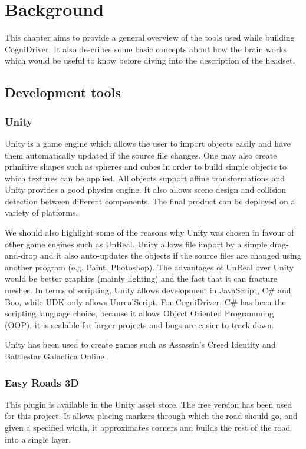 \chapter{Background}
\label{cha:background}

This chapter aims to provide a general overview of the tools used while building CogniDriver. It also describes some basic concepts about how the brain works which would be useful to know before diving into the description of the headset. 

\section{Development tools}

\subsection{Unity}
Unity is a game engine which allows the user to import objects easily and have them automatically updated if the source file changes. One may also create primitive shapes such as spheres and cubes in order to build simple objects to which textures can be applied. All objects support affine transformations and Unity provides a good physics engine. It also allows scene design and collision detection between different components. The final product can be deployed on a variety of platforms.

We should also highlight some of the reasons why Unity was chosen in favour of other game engines such as UnReal. Unity allows file import by a simple drag-and-drop and it also auto-updates the objects if the source files are changed using another program (e.g. Paint, Photoshop). The advantages of UnReal over Unity would be better graphics (mainly lighting) and the fact that it can fracture meshes. In terms of scripting, Unity allows development in JavaScript, C\# and Boo, while UDK only allows UnrealScript. For CogniDriver, C\# has been the scripting language choice, because it allows Object Oriented Programming (OOP), it is scalable for larger projects and bugs are easier to track down. 

Unity has been used to create games such as Assassin's Creed Identity \cite{assassins} and Battlestar Galactica Online \cite{battlestar}.

\subsection{Easy Roads 3D}
This plugin is available in the Unity asset store. The free version has been used for this project. It allows placing markers through which the road should go, and given a specified width, it approximates corners and builds the rest of the road into a single layer.

